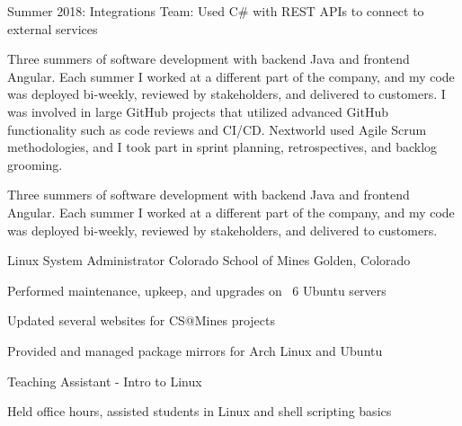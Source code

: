 \begin{cventries}
{\begin{cvitems}
    \item {Summer 2018: Integrations Team: Used C\# with REST APIs to connect to external services }
    \fi
      \end{cvitems}
    }
    {
      \ifcv
      \begin{cventrysummary}
        Three summers of software development with backend Java and frontend Angular.
        Each summer I worked at a different part of the company, and my code was deployed bi-weekly, reviewed by stakeholders, and delivered to customers.
        I was involved in large GitHub projects that utilized advanced GitHub functionality such as code reviews and CI/CD.
        Nextworld used Agile Scrum methodologies, and I took part in sprint planning, retrospectives, and backlog grooming.
      \end{cventrysummary}
      \else
      \begin{cventrysummary}
        Three summers of software development with backend Java and frontend Angular.
        Each summer I worked at a different part of the company, and my code was deployed bi-weekly, reviewed by stakeholders, and delivered to customers.
      \end{cventrysummary}
      \fi
    }

    \cventry
    {Linux System Administrator}
    {Colorado School of Mines}
    {Golden, Colorado}
    {}
    {
        \begin{cvitems}
        \item Performed maintenance, upkeep, and upgrades on ~6 Ubuntu servers
        \item Updated several websites for CS@Mines projects
        \item Provided and managed package mirrors for Arch Linux and Ubuntu
        \end{cvitems}
    }
    {}

    \vspace{-1.0mm}
    \cventry
    {Teaching Assistant - Intro to Linux}
    {}
    {}
    {}
    {
        \begin{cvitems}
        \item Held office hours, assisted students in Linux and shell scripting basics
        \end{cvitems}
    }
    {}



\end{cventries}
